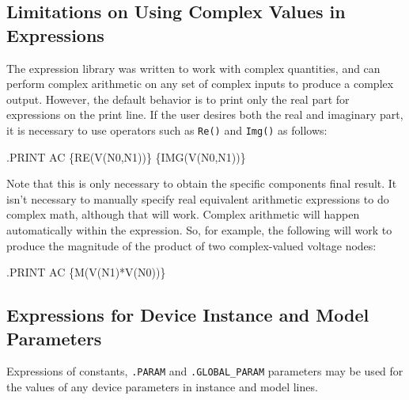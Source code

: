 \begin{centering}
\end{centering}

\subsection{Limitations on Using Complex Values in Expressions}
\label{ComplexExpressions}
The \Xyce{} expression library was written to work with complex
quantities, and can perform complex arithmetic on any set of 
complex inputs to produce a complex output.
However, the default behavior is to print only the real part 
for expressions on the print line.  If the user desires both the
real and imaginary part, it is necessary to use operators 
such as \texttt{Re()} and \texttt{Img()} as follows:

\begin{vquote}
.PRINT AC  \{RE(V(N0,N1))\} \{IMG(V(N0,N1))\}
\end{vquote}

Note that this is only necessary to obtain the specific components 
final result.   It isn't necessary to manually specify real equivalent 
arithmetic expressions to do complex math, although that will work.  Complex 
arithmetic will happen automatically within the expression.  So, for example,
the following will work to produce the magnitude of the product of two 
complex-valued voltage nodes:

\begin{vquote}
.PRINT AC  \{M(V(N1)*V(N0))\}
\end{vquote}

\subsection{Expressions for Device Instance and Model Parameters}

Expressions of constants, \texttt{.PARAM} and \texttt{.GLOBAL\_PARAM} parameters may be used
for the values of any device parameters in instance and model lines.

